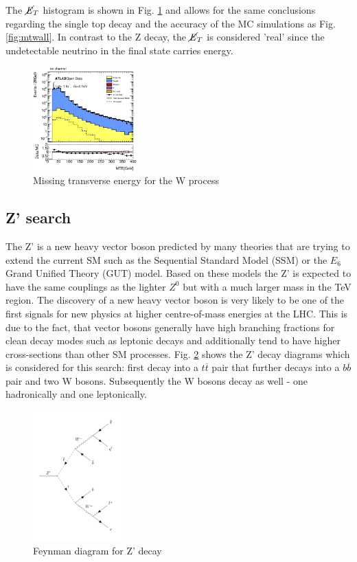 \documentclass[runningheads,a4paper]{llncs}
\begin{document}
The $\cancel{\it{E}}_{T}$ histogram is shown in Fig. \ref{fig:mtewall} and allows for the same conclusions regarding the single top decay and the accuracy of the MC simulations as Fig. \ref{fig:mtwall}. In contrast to the Z decay, the $\cancel{\it{E}}_{T}$ is considered 'real' since the undetectable neutrino in the final state carries energy.

\begin{figure}
\centering
\includegraphics[height=4cm]{ee_mtew_with_dataegamma}
\caption{Missing transverse energy for the W process}
\label{fig:mtewall}
\end{figure}


\subsection{Z' search}

The Z' is a new heavy vector boson predicted by many theories that are trying to extend the current SM such as the Sequential Standard Model (SSM) or the ${E}_{6}$ Grand Unified Theory (GUT) model. Based on these models the Z' is expected to have the same couplings as the lighter ${Z}^{0}$ but with a much larger mass in the TeV region. The discovery of a new heavy vector boson is very likely to be one of the first signals for new physics at higher centre-of-mass energies at the LHC. This is due to the fact, that vector bosons generally have high branching fractions for clean decay modes such as leptonic decays and additionally tend to have higher cross-sections than other SM processes. \cite{hayden2013z}\linebreak
\linebreak
Fig. \ref{fig:feynmzprime} shows the Z' decay diagrams which is considered for this search: first decay into a $t$$\overline t$ pair that further decays into a $b$$\overline b$ pair and two W bosons. Subsequently the W bosons decay as well - one hadronically and one leptonically.

\begin{figure}
\centering
\includegraphics[height=5cm]{feynm_ZPrime}
\caption{Feynman diagram for Z' decay}
\label{fig:feynmzprime}
\end{figure}
\end{document}
